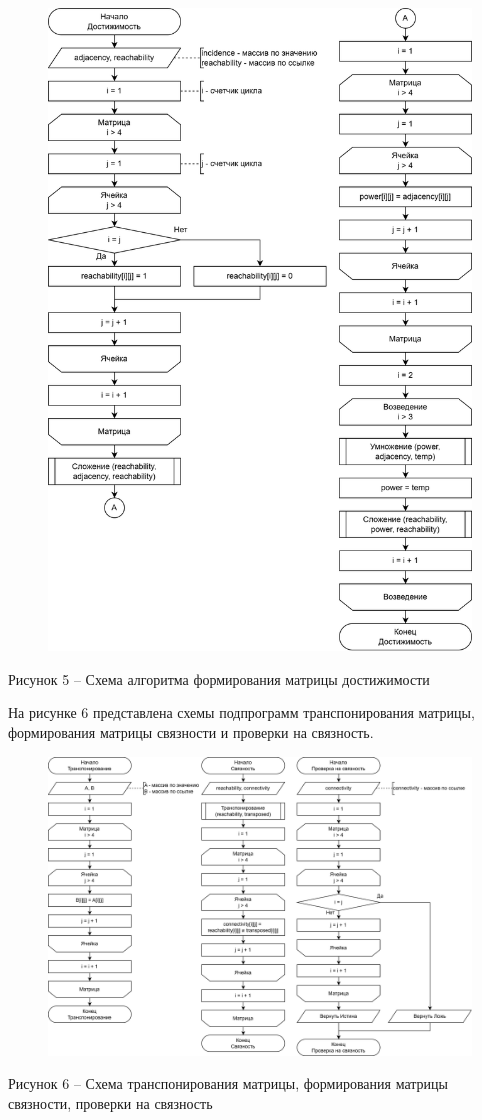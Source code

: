 \documentclass[a4paper,14pt]{extarticle}
\begin{document}
  \begin{figure}[h]
    \centering
    \includegraphics[width=0.7\linewidth]{images/s-4.png}
  \end{figure}
  \begin{center}
    Рисунок 5 – Схема алгоритма формирования матрицы достижимости
  \end{center}

  \pagebreak
  На рисунке 6 представлена схемы подпрограмм транспонирования матрицы, формирования матрицы связности и проверки на связность.

  \begin{figure}[h]
    \centering
    \includegraphics[width=1\linewidth]{images/s-5.png}
  \end{figure}
  \begin{center}
    Рисунок 6 – Схема транспонирования матрицы, формирования матрицы связности, проверки на связность
  \end{center}
\end{document}
